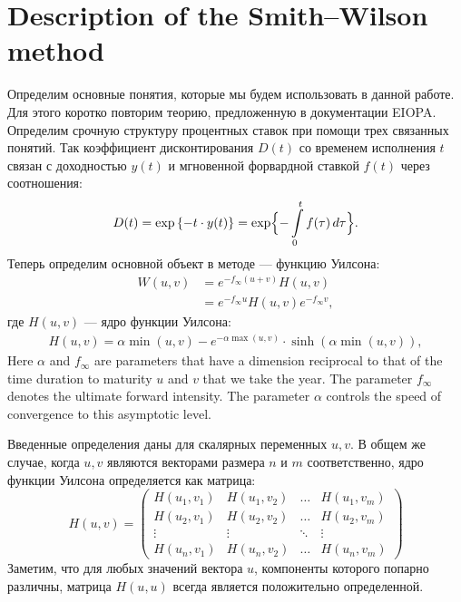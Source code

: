 \documentclass[10pt]{article}
\theoremstyle{definition}
\theoremstyle{remark}
\theoremstyle{plain}
\newcommand{\w}{f_\infty}
\begin{document}
\section{Description of the Smith--Wilson method}
Определим основные понятия, которые мы будем использовать в данной работе. Для этого коротко повторим теорию, предложенную в документации EIOPA\cite[гл. 15]{TechDocEIOPA}. Определим срочную структуру процентных ставок при помощи трех связанных понятий. Так коэффициент дисконтирования $D(t)$ со временем исполнения $t$ связан с доходностью $y(t)$ и мгновенной форвардной ставкой $f(t)$ через соотношения:
\begin{align*}
D(t) = 
\exp\left\{
	- t \cdot y(t)
	\right\}
=
\exp\Bigl\{
	- \int\limits_0^t f(\tau)\,d\tau
	\Bigr\}
.
\end{align*}
Теперь определим основной объект в методе --- функцию Уилсона:
\begin{align}
W(u,v) &= e^{-f_\infty (u+v)}H(u,v)\\
&= e^{-\w u}H(u,v)e^{-\w v},
\end{align}
где $H(u,v)$ --- ядро функции Уилсона:
\begin{align}
H(u,v) = \alpha \min(u,v) - e^{-\alpha\max(u,v)}\cdot \sinh(\alpha\min(u,v)),
\end{align}
Here $\alpha$ and $\w$ are parameters that have a dimension reciprocal to that of the time duration to maturity $u$ and $v$ that we take the year.
The parameter $\w$ denotes the ultimate forward intensity. The parameter $\alpha$ controls the speed of convergence to this asymptotic level.

Введенные определения даны для скалярных переменных $u,v$. В  общем же случае, когда $u,v$ являются векторами размера $n$ и $m$ соответственно, ядро функции Уилсона определяется как матрица:
$$
H(u,v) = 
\begin{pmatrix}
H(u_1,v_1)& H(u_1,v_2) &\ldots & H(u_1,v_m)\\
H(u_2,v_1)& H(u_2,v_2) &\ldots & H(u_2,v_m)\\
\vdots& \vdots &\ddots & \vdots\\
H(u_n,v_1)& H(u_n,v_2) &\ldots & H(u_n,v_m)
\end{pmatrix}
$$
Заметим, что для любых значений вектора $u$, компоненты которого попарно различны, матрица $H(u,u)$ всегда является положительно определенной.
\end{document}
